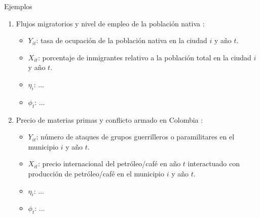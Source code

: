 \documentclass[10pt, xcolor=dvipsnames]{beamer}
\begin{document}
\begin{frame}{Ejemplos}
	\begin{enumerate}
		\item Flujos migratorios y nivel de empleo de la población nativa \citep{Tabellini2020}: \vspace{0.1cm}
		\begin{itemize}
			\item $Y_{it}$: tasa de ocupación de la población nativa en la ciudad $i$ y año $t$.
			\item $X_{it}$: porcentaje de inmigrantes relativo a la población total en la ciudad $i$ y año $t$. 
			\item $\eta_i$: ...
            \item $\phi_t$: ... \\ \vspace{0.4cm}
		\end{itemize}			
		\item Precio de materias primas y conflicto armado en Colombia \citep{dube_commodity_2013}: \vspace{0.1cm}
		\begin{itemize}
			\item $Y_{it}$: número de ataques de grupos guerrilleros o paramilitares en el municipio $i$ y año $t$.
			\item $X_{it}$: precio internacional del petróleo/café en año $t$ interactuado con producción de petróleo/café en el municipio $i$ y año $t$.
			\item $\eta_i$: ...
            \item $\phi_t$: ... \\ \vspace{0.4cm}
		\end{itemize}		 	
	\end{enumerate}
\end{frame}
\end{document}
